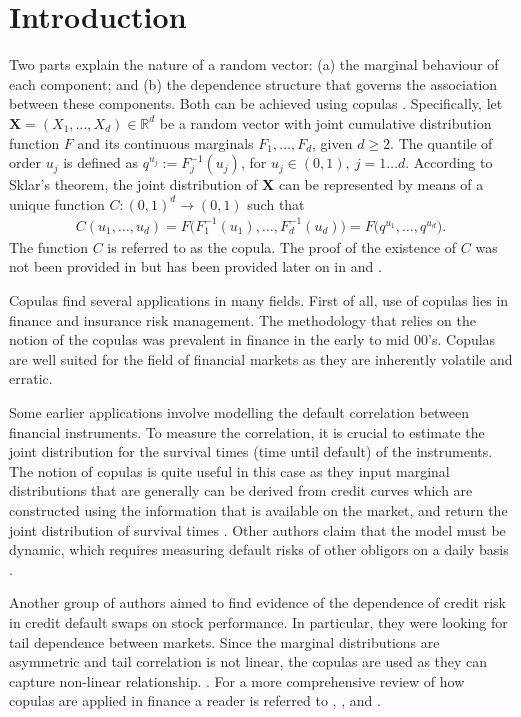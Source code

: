 \documentclass[12pt]{article}
\begin{document}
	\setcounter{page}{1}
	
	\section{Introduction}
	Two parts explain the nature of a random vector: (a) the marginal behaviour of each component; and (b) the dependence structure that governs the association between these components. Both can be achieved using copulas \parencite{Sklar1959}. Specifically, let $ \mathbf{X}=(X_1, \dots, X_d) \in \mathbb{R}^d $ be a random vector with joint cumulative distribution function $ F $ and its continuous marginals $ F_1, \dots, F_d $, given $ d \geq 2 $. The quantile of order $ u_j $ is defined as $ q^{u_j} := F^{-1}_j(u_j) $, for $ u_j\in(0, 1), ~j=1\dots d $. According to Sklar's theorem, the joint distribution of $ \mathbf{X} $ can be represented by means of a unique function $ C:(0, 1)^d \rightarrow(0, 1) $ such that
	\begin{align}
		C(u_1, \dots, u_d) = F\big(F^{-1}_1(u_1), \dots, F^{-1}_d(u_d)\big) = F\big(q^{u_1}, \dots, q^{u_d}\big). \label{eq:copula_def}
	\end{align}
	The function $ C $ is referred to as the copula. The proof of the existence of $ C $ was not been provided in \textcite{Sklar1959} but has been provided later on in \textcite{Moore1975} and \textcite{Deheuvels1978}.
	
	Copulas find several applications in many fields. First of all, use of copulas lies in finance and insurance risk management. The methodology that relies on the notion of the copulas was prevalent in finance in the early to mid 00's. Copulas are well suited for the field of financial markets as they are inherently volatile and erratic. 
	
	Some earlier applications involve modelling the default correlation between financial instruments. To measure the correlation, it is crucial to estimate the joint distribution for the survival times (time until default) of the instruments. The notion of copulas is quite useful in this case as they input marginal distributions that are generally can be derived from credit curves which are constructed using the information that is available on the market, and return the joint distribution of survival times \parencite{Li1999}. Other authors claim that the model must be dynamic, which requires measuring default risks of other obligors on a daily basis \parencite{Schonbucher2001}.
	
	Another group of authors aimed to find evidence of the dependence of credit risk in credit default swaps on stock performance. In particular, they were looking for tail dependence between markets. Since the marginal distributions are asymmetric and tail correlation is not linear, the copulas are used as they can capture non-linear relationship.  \parencite{Dupuis2009,DaSilva2014,Andersen2004,Kresta2012}. For a more comprehensive review of how copulas are applied in finance a reader is referred to \textcite{Cherubini2004}, \textcite{Patton2009}, and \textcite{Patton2012}.
	
\end{document}
